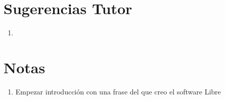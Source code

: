 \documentclass[a4paper, 12pt]{book}
\begin{document}
\chapter*{Sugerencias Tutor}
\begin{enumerate}
    \item 
\end{enumerate}

\chapter*{Notas}
\begin{enumerate}
    \item Empezar introducción con una frase del que creo el software Libre
\end{enumerate}
\end{document}
